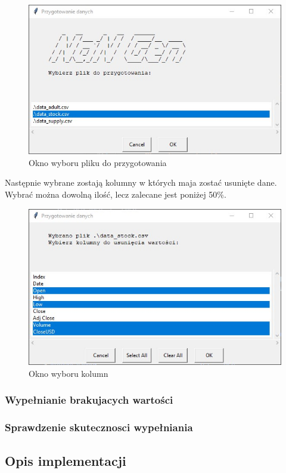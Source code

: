 \documentclass[12pt,twoside]{article}
\begin{document}
\begin{figure}[ht]
	\centering
	\includegraphics[width=12cm]{img/02.jpg}
	\caption{Okno wyboru pliku do przygotowania}
\label{Fig:gen_file}
\end{figure}

Następnie wybrane zostają kolumny w których maja zostać usunięte dane. Wybrać można dowolną ilość, lecz zalecane jest poniżej 50\%.

\begin{figure}[ht]
	\centering
	\includegraphics[width=12cm]{img/03.jpg}
	\caption{Okno wyboru kolumn}
\label{Fig:gen_col}
\end{figure}

\subsubsection{Wypełnianie brakujacych wartości}
\subsubsection{Sprawdzenie skutecznosci wypełniania}
\subsection{Opis implementacji}
\end{document}

